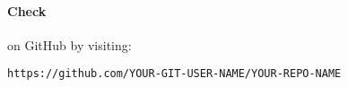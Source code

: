 \documentclass{ximera}
\begin{document}
\paragraph{Check} on GitHub by visiting:
\begin{center}
    \verb!https://github.com/YOUR-GIT-USER-NAME/YOUR-REPO-NAME!
\end{center}
\pdfOnly{\end{minipage}}
\pdfOnly{\end{multicols*}}



\twocolumn
\end{document}
